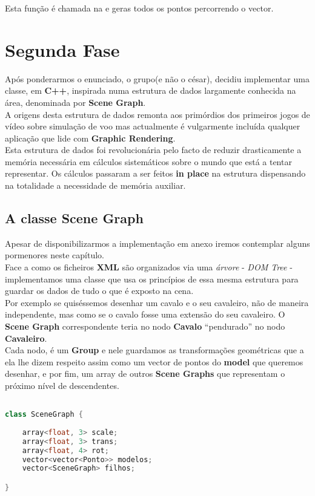 \documentclass{article}
\begin{document}
Esta função é chamada na  e geras todos os pontos percorrendo o vector.

\newpage

\section{Segunda Fase}
Após ponderarmos o enunciado, o grupo(e não o césar), decidiu implementar uma classe, em \textbf{C++}, inspirada numa estrutura de dados largamente conhecida na área, denominada por \textbf{Scene Graph}.\\
A origens desta estrutura de dados remonta aos primórdios dos primeiros jogos de vídeo sobre simulação de voo mas actualmente é vulgarmente incluída qualquer aplicação que lide com \textbf{Graphic Rendering}.\\
Esta estrutura de dados foi revolucionária pelo facto de reduzir drasticamente a memória necessária em cálculos sistemáticos sobre o mundo que está a tentar representar. Os cálculos passaram a ser feitos \textbf{in place} na estrutura dispensando na totalidade a necessidade de memória auxiliar. 

\subsection{A classe Scene Graph}
Apesar de disponibilizarmos a implementação em anexo iremos contemplar alguns pormenores neste capítulo.\\
Face a como os ficheiros \textbf{XML} são organizados via uma \textit{árvore} - \textit{DOM Tree} - implementamos uma classe que usa os princípios de essa mesma estrutura para guardar os dados de tudo o que é exposto na cena.\\
Por exemplo se quiséssemos desenhar um cavalo e o seu cavaleiro, não de maneira independente, mas como se o cavalo fosse uma extensão do seu cavaleiro. O \textbf{Scene Graph} correspondente teria no nodo \textbf{Cavalo} “pendurado” no nodo \textbf{Cavaleiro}.\\
Cada nodo, é um \textbf{Group} e nele guardamos as transformações geométricas que a ela lhe dizem respeito assim como um vector de pontos do \textbf{model} que queremos desenhar, e por fim, um array de outros \textbf{Scene Graphs} que representam o próximo nível de descendentes.\\

\begin{file}
    \begin{lstlisting}[language=C++]

class SceneGraph {
    
    array<float, 3> scale;
    array<float, 3> trans;
    array<float, 4> rot;
    vector<vector<Ponto>> modelos;
    vector<SceneGraph> filhos;

}

    \end{lstlisting}
\end{file}
\end{document}
